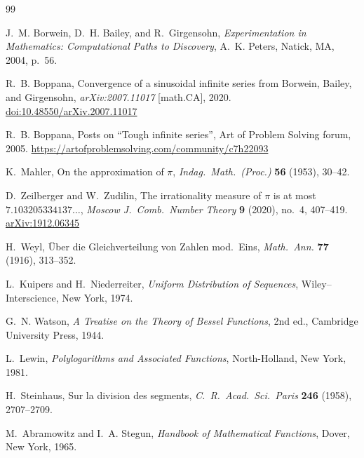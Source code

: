 \documentclass[12pt]{amsart}
\begin{document}
\begin{thebibliography}{99}

J.~M. Borwein, D.~H. Bailey, and R.~Girgensohn,
\emph{Experimentation in Mathematics: Computational Paths to
Discovery}, A.~K. Peters, Natick, MA, 2004, p.~56.

R.~B. Boppana,
Convergence of a sinusoidal infinite series from Borwein, Bailey, and
Girgensohn,
\emph{arXiv:2007.11017} [math.CA], 2020.
\href{https://doi.org/10.48550/arXiv.2007.11017}{doi:10.48550/arXiv.2007.11017}

R.~B. Boppana,
Posts on ``Tough infinite series'',
Art of Problem Solving forum, 2005.
\url{https://artofproblemsolving.com/community/c7h22093}

K.~Mahler,
On the approximation of $\pi$,
\emph{Indag.\ Math.\ (Proc.)} \textbf{56} (1953), 30--42.

D.~Zeilberger and W.~Zudilin,
The irrationality measure of $\pi$ is at most $7.103205334137\ldots$,
\emph{Moscow J.\ Comb.\ Number Theory} \textbf{9} (2020), no.~4,
407--419.
\href{https://arxiv.org/abs/1912.06345}{arXiv:1912.06345}

H.~Weyl,
\"Uber die Gleichverteilung von Zahlen mod.\ Eins,
\emph{Math.\ Ann.} \textbf{77} (1916), 313--352.

L.~Kuipers and H.~Niederreiter,
\emph{Uniform Distribution of Sequences},
Wiley--Interscience, New York, 1974.

G.~N. Watson,
\emph{A Treatise on the Theory of Bessel Functions},
2nd ed., Cambridge University Press, 1944.

L.~Lewin,
\emph{Polylogarithms and Associated Functions},
North-Holland, New York, 1981.

H.~Steinhaus,
Sur la division des segments,
\emph{C.\ R.\ Acad.\ Sci.\ Paris} \textbf{246} (1958), 2707--2709.

M.~Abramowitz and I.~A. Stegun,
\emph{Handbook of Mathematical Functions},
Dover, New York, 1965.

\end{thebibliography}
\end{document}
